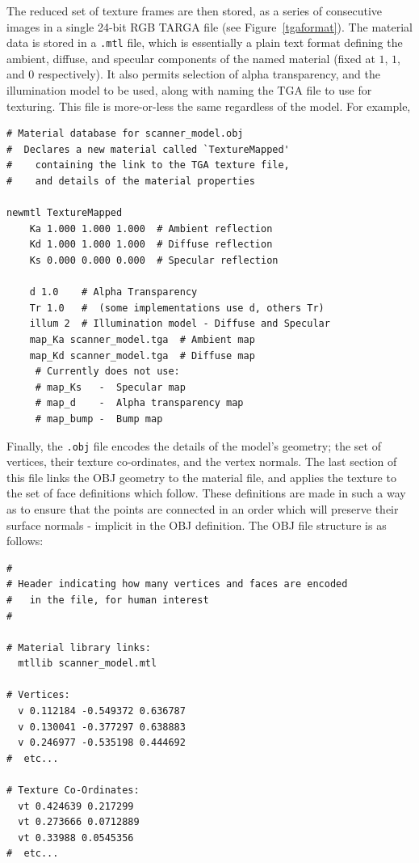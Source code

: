 \documentclass[a4paper,10pt]{article}
\begin{document}
\begin{itemize}
{The reduced set of texture frames are then stored, as a series of consecutive images in a single 24-bit RGB TARGA\cite{targa} file (see Figure~\ref{tgaformat}). The material data is stored in a \texttt{.mtl} file, which is essentially a plain text format defining the ambient, diffuse, and specular components of the named material (fixed at $1$, $1$, and $0$ respectively). It also permits selection of alpha transparency, and the illumination model to be used, along with naming the TGA file to use for texturing. This file is more-or-less the same regardless of the model. For example,

\begin{verbatim}
# Material database for scanner_model.obj
#  Declares a new material called `TextureMapped'
#    containing the link to the TGA texture file,
#    and details of the material properties

newmtl TextureMapped
    Ka 1.000 1.000 1.000  # Ambient reflection
    Kd 1.000 1.000 1.000  # Diffuse reflection
    Ks 0.000 0.000 0.000  # Specular reflection
 
    d 1.0    # Alpha Transparency
    Tr 1.0   #  (some implementations use d, others Tr)
    illum 2  # Illumination model - Diffuse and Specular
    map_Ka scanner_model.tga  # Ambient map
    map_Kd scanner_model.tga  # Diffuse map
     # Currently does not use:
     # map_Ks   -  Specular map
     # map_d    -  Alpha transparency map
     # map_bump -  Bump map
\end{verbatim}

Finally, the \texttt{.obj} file encodes the details of the model's geometry; the set of vertices, their texture co-ordinates, and the vertex normals. The last section of this file links the OBJ geometry to the material file, and applies the texture to the set of face definitions which follow. These definitions are made in such a way as to ensure that the points are connected in an order which will preserve their surface normals - implicit in the OBJ definition. The OBJ file structure is as follows:

\begin{verbatim}
#
# Header indicating how many vertices and faces are encoded
#   in the file, for human interest
#

# Material library links:
  mtllib scanner_model.mtl

# Vertices:
  v 0.112184 -0.549372 0.636787
  v 0.130041 -0.377297 0.638883
  v 0.246977 -0.535198 0.444692
#  etc...

# Texture Co-Ordinates:
  vt 0.424639 0.217299
  vt 0.273666 0.0712889
  vt 0.33988 0.0545356
#  etc...


\end{verbatim}}
\end{itemize}
\end{document}
